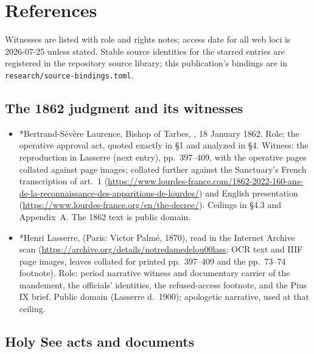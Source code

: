 \sectionguard
\section{References}

Witnesses are listed with role and rights notes; access date for
all web loci is 2026-07-25 unless stated. Stable source
identities for the starred entries are registered in the
repository source library; this publication's bindings are in
\texttt{research/source-bindings.toml}.

\subsection*{The 1862 judgment and its witnesses}

\begin{itemize}
\item *Bertrand-S\'ev\`ere Laurence, Bishop of Tarbes,
, 18
January 1862. Role: the operative approval act, quoted exactly in
\S1 and analyzed in \S4. Witness: the reproduction in Lasserre
(next entry), pp.~397--409, with the operative pages collated
against page images; collated further against the Sanctuary's
French transcription of art.~1
(\url{https://www.lourdes-france.com/1862-2022-160-ans-de-la-reconnaissance-des-apparitions-de-lourdes/})
and English presentation
(\url{https://www.lourdes-france.org/en/the-decree/}). Ceilings
in \S4.3 and Appendix~A. The 1862 text is public domain.
\item *Henri Lasserre,  (Paris:
Victor Palm\'e, 1870), read in the Internet Archive scan
(\url{https://archive.org/details/notredamedelou00lass}; OCR
text and IIIF page images, leaves collated for printed
pp.~397--409 and the pp.~73--74 footnote). Role: period
narrative witness and documentary carrier of the mandement, the
officials' identities, the refused-access footnote, and the
Pius IX brief. Public domain (Lasserre d.~1900); apologetic
narrative, used at that ceiling.
\end{itemize}

\subsection*{Holy See acts and documents}

